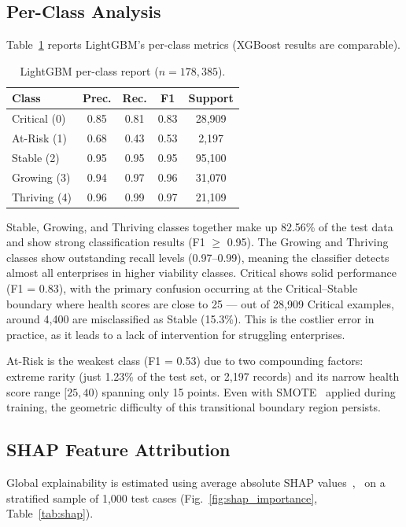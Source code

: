 \documentclass[conference]{IEEEtran}
\begin{document}
\subsection{Per-Class Analysis}

Table~\ref{tab:perclass} reports LightGBM's per-class metrics (XGBoost results are comparable).

\begin{table}[htbp]
\centering
\caption{LightGBM per-class report ($n = 178{,}385$).}
\label{tab:perclass}
\begin{tabular}{lcccc}
\hline
\textbf{Class} & \textbf{Prec.} & \textbf{Rec.} & \textbf{F1} & \textbf{Support} \\
\hline
Critical (0) & 0.85 & 0.81 & 0.83 & 28,909 \\
At-Risk (1)  & 0.68 & 0.43 & 0.53 & 2,197  \\
Stable (2)   & 0.95 & 0.95 & 0.95 & 95,100 \\
Growing (3)  & 0.94 & 0.97 & 0.96 & 31,070 \\
Thriving (4) & 0.96 & 0.99 & 0.97 & 21,109 \\
\hline
\end{tabular}
\end{table}

Stable, Growing, and Thriving classes together make up 82.56\% of the test data and show strong classification results (F1 $\geq$ 0.95). The Growing and Thriving classes show outstanding recall levels (0.97--0.99), meaning the classifier detects almost all enterprises in higher viability classes. Critical shows solid performance (F1 = 0.83), with the primary confusion occurring at the Critical--Stable boundary where health scores are close to 25 --- out of 28,909 Critical examples, around 4,400 are misclassified as Stable (15.3\%). This is the costlier error in practice, as it leads to a lack of intervention for struggling enterprises.

At-Risk is the weakest class (F1 = 0.53) due to two compounding factors: extreme rarity (just 1.23\% of the test set, or 2,197 records) and its narrow health score range $[25, 40)$ spanning only 15 points. Even with SMOTE~\cite{12} applied during training, the geometric difficulty of this transitional boundary region persists.

\subsection{SHAP Feature Attribution}

Global explainability is estimated using average absolute SHAP values~\cite{17},~\cite{18} on a stratified sample of 1,000 test cases (Fig.~\ref{fig:shap_importance}, Table~\ref{tab:shap}).
\end{document}
